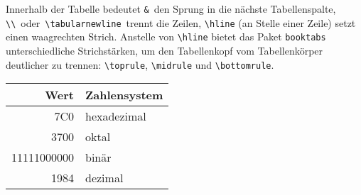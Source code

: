 Innerhalb der Tabelle bedeutet
\lstinline|&|~den Sprung in die nächste Tabellenspalte,
\lstinline|\\|~oder~\lstinline|\tabularnewline|~trennt die Zeilen,
\lstinline|\hline| (an Stelle einer Zeile) setzt einen waagrechten
Strich. Anstelle von \lstinline|\hline| bietet das Paket \texttt{booktabs} unterschiedliche Strichstärken, um den Tabellenkopf vom Tabellenkörper deutlicher zu trennen: \lstinline|\toprule|, \lstinline|\midrule|  und \lstinline|\bottomrule|.

\begingroup
\def\arraystretch{1.1}
\begin{LTXexample}
\begin{tabular}[t]{rl}
\toprule
Wert & Zahlensystem \\
\midrule
7C0 & hexadezimal \\
3700 & oktal \\
11111000000 & binär \\
1984 & dezimal \\
\bottomrule
\end{tabular}
\end{LTXexample}
\endgroup

\endinput
